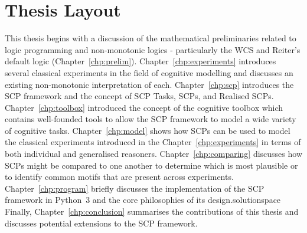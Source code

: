 \section{Thesis Layout} \label{sec:layout}
This thesis begins with a discussion of the mathematical preliminaries related to logic programming and non-monotonic logics - particularly the WCS and Reiter's default logic (Chapter~\ref{chp:prelim}). Chapter~\ref{chp:experiments} introduces several classical experiments in the field of cognitive modelling and discusses an existing non-monotonic interpretation of each. Chapter~\ref{chp:scp} introduces the SCP framework and the concept of SCP Tasks, SCPs, and Realised SCPs. Chapter~\ref{chp:toolbox} introduced the concept of the cognitive toolbox which contains well-founded tools to allow the SCP framework to model a wide variety of cognitive tasks. Chapter~\ref{chp:model} shows how SCPs can be used to model the classical experiments introduced in the Chapter~\ref{chp:experiments} in terms of both individual and generalised reasoners. Chapter~\ref{chp:comparing} discusses how SCPs might be compared to one another to determine which is most plausible or to identify common motifs that are present across experiments. Chapter~\ref{chp:program} briefly discusses the implementation of the SCP framework in Python~3 and the core philosophies of its design.solutionspace Finally, Chapter~\ref{chp:conclusion} summarises the contributions of this thesis and discusses potential extensions to the SCP framework.